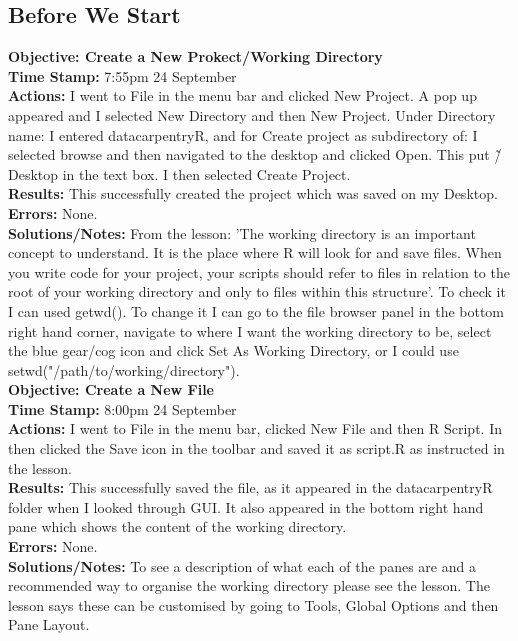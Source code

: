 \documentclass{article}
\begin{document}
\begin{FlushLeft}
\subsection{Before We Start}
\textbf{Objective: Create a New Prokect/Working Directory}\\ 
\textbf{Time Stamp:} 7:55pm 24 September\\
\textbf{Actions:} I went to File in the menu bar and clicked New Project. A pop up appeared and I selected New Directory and then New Project. Under Directory name: I entered data\textunderscore carpentry\textunderscore R, and for Create project as subdirectory of: I selected browse and then navigated to the desktop and clicked Open. This put \~/Desktop in the text box. I then selected Create Project. \\
\textbf{Results:} This successfully created the project which was saved on my Desktop.\\
\textbf{Errors:} None.\\
\textbf{Solutions/Notes:} From the lesson: 'The working directory is an important concept to understand. It is the place where R will look for and save files. When you write code for your project, your scripts should refer to files in relation to the root of your working directory and only to files within this structure'. To check it I can used getwd(). To change it I can go to the file browser panel in the bottom right hand corner, navigate to where I want the working directory to be, select the blue gear/cog icon and click Set As Working Directory, or I could use setwd("/path/to/working/directory").\\
\vspace{5mm}
\textbf{Objective: Create a New File}\\ 
\textbf{Time Stamp:} 8:00pm 24 September\\
\textbf{Actions:} I went to File in the menu bar, clicked New File and then R Script. In then clicked the Save icon in the toolbar and saved it as script.R as instructed in the lesson.\\
\textbf{Results:} This successfully saved the file, as it appeared in the data\textunderscore carpentry\textunderscore R folder when I looked through GUI. It also appeared in the bottom right hand pane which shows the content of the working directory.\\
\textbf{Errors:} None.\\
\textbf{Solutions/Notes:} To see a description of what each of the panes are and a recommended way to organise the working directory please see the lesson. The lesson says these can be customised by going to Tools, Global Options and then Pane Layout.\\

\end{FlushLeft}
\end{document}
